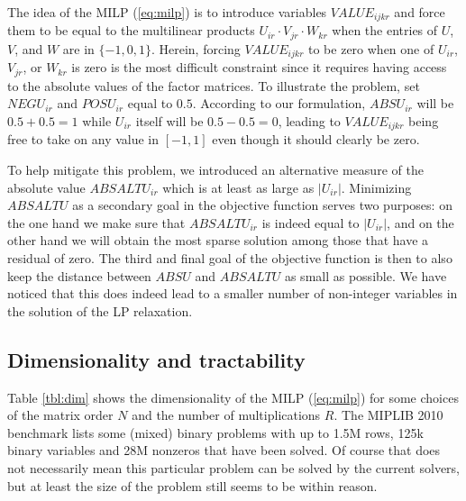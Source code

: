 \documentclass{article}
\begin{document}
The idea of the MILP (\ref{eq:milp}) is to introduce variables $\mathit{VALUE}_{ijkr}$ and force them to be equal to the multilinear products $U_{ir}\cdot V_{jr}\cdot W_{kr}$ when the entries of $U$, $V$, and $W$ are in $\{-1,0,1\}$. Herein, forcing $\mathit{VALUE}_{ijkr}$ to be zero when one of $U_{ir}$, $V_{jr}$, or $W_{kr}$ is zero is the most difficult constraint since it requires having access to the absolute values of the factor matrices. To illustrate the problem, set $\mathit{NEGU}_{ir}$ and $\mathit{POSU}_{ir}$ equal to $0.5$. According to our formulation, $\mathit{ABSU}_{ir}$ will be $0.5 + 0.5 = 1$ while $U_{ir}$ itself will be $0.5 - 0.5 = 0$, leading to $\mathit{VALUE}_{ijkr}$ being free to take on any value in $[-1,1]$ even though it should clearly be zero.

To help mitigate this problem, we introduced an alternative measure of the absolute value $\mathit{ABSALTU}_{ir}$ which is at least as large as $|U_{ir}|$. Minimizing $\mathit{ABSALTU}$ as a secondary goal in the objective function serves two purposes: on the one hand we make sure that $\mathit{ABSALTU}_{ir}$ is indeed equal to $|U_{ir}|$, and on the other hand we will obtain the most sparse solution among those that have a residual of zero. The third and final goal of the objective function is then to also keep the distance between $\mathit{ABSU}$ and $\mathit{ABSALTU}$ as small as possible. We have noticed that this does indeed lead to a smaller number of non-integer variables in the solution of the LP relaxation.

\subsection{Dimensionality and tractability}

Table \ref{tbl:dim} shows the dimensionality of the MILP (\ref{eq:milp}) for some choices of the matrix order $N$ and the number of multiplications $R$. The MIPLIB 2010 benchmark \cite{MIPLIB2010} lists some (mixed) binary problems with up to 1.5M rows, 125k binary variables and 28M nonzeros that have been solved. Of course that does not necessarily mean this particular problem can be solved by the current solvers, but at least the size of the problem still seems to be within reason.
\end{document}
